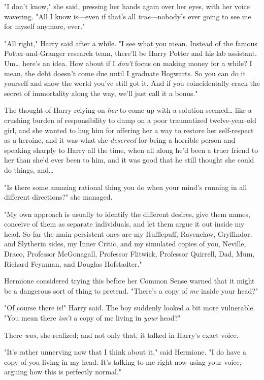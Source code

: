 "I don't know," she said, pressing her hands again over her eyes, with her 
voice wavering. "All I know is---even if that's all \emph{true}---nobody's ever 
going to see me for myself anymore, ever."

"All right," Harry said after a while. "I see what you mean. Instead of the 
famous Potter-and-Granger research team, there'll be Harry Potter and his lab 
assistant. Um{\ldots} here's an idea. How about if I \emph{don't} focus on 
making money for a while? I mean, the debt doesn't come due until I graduate 
Hogwarts. So you can do it yourself and show the world you've still got it. And 
if you coincidentally crack the secret of immortality along the way, we'll just 
call it a bonus."

The thought of Harry relying on \emph{her} to come up with a solution 
seemed{\ldots} like a crushing burden of responsibility to dump on a poor 
traumatized twelve-year-old girl, and she wanted to hug him for offering her a 
way to restore her self-respect as a heroine, and it was what she 
\emph{deserved} for being a horrible person and speaking sharply to Harry all 
the time, when all along he'd been a truer friend to her than she'd ever been 
to him, and it was good that he still thought she could do things, and{\ldots}

"Is there some amazing rational thing you do when your mind's running in all 
different directions?" she managed.

"My own approach is usually to identify the different desires, give them names, 
conceive of them as separate individuals, and let them argue it out inside my 
head. So far the main persistent ones are my Hufflepuff, Ravenclaw, Gryffindor, 
and Slytherin sides, my Inner Critic, and my simulated copies of you, Neville, 
Draco, Professor McGonagall, Professor Flitwick, Professor Quirrell, Dad, Mum, 
Richard Feynman, and Douglas Hofstadter."

Hermione considered trying this before her Common Sense warned that it might be 
a dangerous sort of thing to pretend. "There's a copy of \emph{me} inside your 
head?"

"Of course there is!" Harry said. The boy suddenly looked a bit more 
vulnerable. "You mean there \emph{isn't} a copy of me living in \emph{your} 
head?"

There \emph{was,} she realized; and not only that, it talked in Harry's exact 
voice.

"It's rather unnerving now that I think about it," said Hermione. "I do have a 
copy of you living in my head. It's talking to me right now using your voice, 
arguing how this is perfectly normal."

